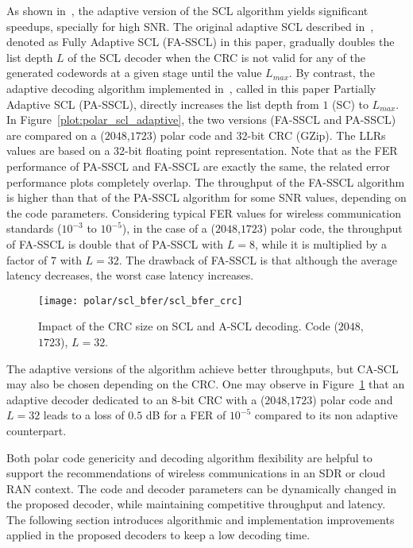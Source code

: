 As shown in~\cite{Sarkis2016}, the adaptive version of the SCL algorithm yields
significant speedups, specially for high SNR. The original adaptive SCL
described in~\cite{Li2012}, denoted as Fully Adaptive SCL (FA-SSCL) in this
paper, gradually doubles the list depth $L$ of the SCL decoder when the CRC is
not valid for any of the generated codewords at a given stage until the value
$L_{max}$. By contrast, the adaptive decoding algorithm implemented
in~\cite{Sarkis2016}, called in this paper Partially Adaptive SCL (PA-SSCL),
directly increases the list depth from $1$ (SC) to $L_{max}$. In
Figure~\ref{plot:polar_scl_adaptive}, the two versions (FA-SSCL and PA-SSCL) are
compared on a ($2048$,$1723$) polar code and 32-bit CRC (GZip). The LLRs values
are based on a 32-bit floating point representation. Note that as the FER
performance of PA-SSCL and FA-SSCL are exactly the same, the related error
performance plots completely overlap. The throughput of the FA-SSCL algorithm is
higher than that of the PA-SSCL algorithm for some SNR values, depending on the
code parameters. Considering typical FER values for wireless communication
standards ($10^{-3}$ to $10^{-5}$), in the case of a ($2048$,$1723$) polar code,
the throughput of FA-SSCL is double that of PA-SSCL with $L = 8$, while it is
multiplied by a factor of $7$ with $L=32$. The drawback of FA-SSCL is that
although the average latency decreases, the worst case latency increases.

\begin{figure}[htp]
  \centering
  \texttt{[image: polar/scl\_bfer/scl\_bfer\_crc]}
  \caption{Impact of the CRC size on SCL and A-SCL decoding. Code ($2048$,
    $1723$), $L=32$.}
  \label{plot:polar_scl_bfer_crc}
\end{figure}

The adaptive versions of the algorithm achieve better throughputs, but CA-SCL
may also be chosen depending on the CRC. One may observe in
Figure~\ref{plot:polar_scl_bfer_crc} that an adaptive decoder dedicated to an
8-bit CRC with a ($2048$,$1723$) polar code and $L=32$ leads to a loss of $0.5$
dB for a FER of $10^{-5}$ compared to its non adaptive counterpart.

Both polar code genericity and decoding algorithm flexibility are helpful to
support the recommendations of wireless communications in an SDR or cloud RAN
context. The code and decoder parameters can be dynamically changed in the
proposed decoder, while maintaining competitive throughput and latency. The
following section introduces algorithmic and implementation improvements applied
in the proposed decoders to keep a low decoding time.

